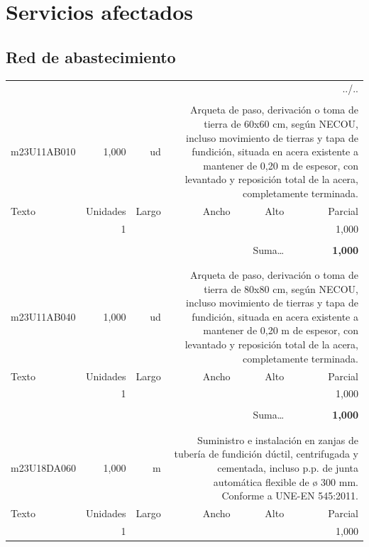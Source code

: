 \documentclass{book}%
\begin{document}
%
\section{Servicios afectados}%
\subsection{Red de abastecimiento}%
\begin{longtable}{lrrrrr}%
\multicolumn{6}{r}{../..}\\%
\endfoot%
\endlastfoot%
&&&&&\\%
m23U11AB010&     1,000& ud&\multicolumn{3}{p{6cm}}{\scriptsize Arqueta de paso, derivación o toma de tierra de 60x60 cm, según NECOU, incluso movimiento de tierras y tapa de fundición, situada en acera existente a mantener de 0,20 m de espesor, con levantado y reposición total de la acera, completamente terminada.\normalsize}\\%
Texto&Unidades&Largo&Ancho&Alto&Parcial\\%
\hline%
\multicolumn{1}{p{3.5cm}}{ }&1&&&&     1,000\\%
&&&&&\\%
\multicolumn{5}{r}{Suma\ldots}&\textbf{     1,000}\\%
\hline%
&&&&&\\%
&&&&&\\%
m23U11AB040&     1,000& ud&\multicolumn{3}{p{6cm}}{\scriptsize Arqueta de paso, derivación o toma de tierra de 80x80 cm, según NECOU, incluso movimiento de tierras y tapa de fundición, situada en acera existente a mantener de 0,20 m de espesor, con levantado y reposición total de la acera, completamente terminada.\normalsize}\\%
Texto&Unidades&Largo&Ancho&Alto&Parcial\\%
\hline%
\multicolumn{1}{p{3.5cm}}{ }&1&&&&     1,000\\%
&&&&&\\%
\multicolumn{5}{r}{Suma\ldots}&\textbf{     1,000}\\%
\hline%
&&&&&\\%
&&&&&\\%
m23U18DA060&     1,000& m&\multicolumn{3}{p{6cm}}{\scriptsize Suministro e instalación en zanjas de tubería de fundición dúctil, centrifugada y cementada, incluso p.p. de junta automática flexible de ø 300 mm. Conforme a UNE-EN 545:2011.\normalsize}\\%
Texto&Unidades&Largo&Ancho&Alto&Parcial\\%
\hline%
\multicolumn{1}{p{3.5cm}}{ }&1&&&&     1,000\\%

\end{longtable}
\end{document}
